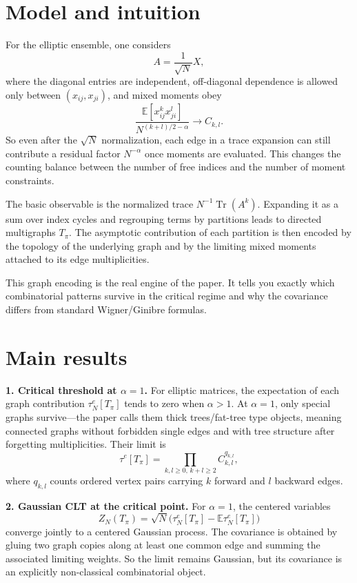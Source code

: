 \documentclass[11pt]{article}
\begin{document}
\section*{Model and intuition}
For the elliptic ensemble, one considers
\[
A=\frac{1}{\sqrt N}X,
\]
where the diagonal entries are independent, off-diagonal dependence is allowed only between $(x_{ij},x_{ji})$, and mixed moments obey
\[
\frac{\mathbb E[x_{ij}^k x_{ji}^l]}{N^{(k+l)/2-\alpha}}\to C_{k,l}.
\]
So even after the $\sqrt N$ normalization, each edge in a trace expansion can still contribute a residual factor $N^{-\alpha}$ once moments are evaluated. This changes the counting balance between the number of free indices and the number of moment constraints.

The basic observable is the normalized trace $N^{-1}\operatorname{Tr}(A^k)$. Expanding it as a sum over index cycles and regrouping terms by partitions leads to directed multigraphs $T_\pi$. The asymptotic contribution of each partition is then encoded by the topology of the underlying graph and by the limiting mixed moments attached to its edge multiplicities.

This graph encoding is the real engine of the paper. It tells you exactly which combinatorial patterns survive in the critical regime and why the covariance differs from standard Wigner/Ginibre formulas.

\section*{Main results}
\textbf{1. Critical threshold at $\alpha=1$.} For elliptic matrices, the expectation of each graph contribution $\tau_N^e[T_\pi]$ tends to zero when $\alpha>1$. At $\alpha=1$, only special graphs survive---the paper calls them thick trees/fat-tree type objects, meaning connected graphs without forbidden single edges and with tree structure after forgetting multiplicities. Their limit is
\[
\tau^e[T_\pi]=\prod_{k,l\ge 0,\,k+l\ge 2} C_{k,l}^{q_{k,l}},
\]
where $q_{k,l}$ counts ordered vertex pairs carrying $k$ forward and $l$ backward edges.

\textbf{2. Gaussian CLT at the critical point.} For $\alpha=1$, the centered variables
\[
Z_N(T_\pi)=\sqrt N\bigl(\tau_N^e[T_\pi]-\mathbb E\tau_N^e[T_\pi]\bigr)
\]
converge jointly to a centered Gaussian process. The covariance is obtained by gluing two graph copies along at least one common edge and summing the associated limiting weights. So the limit remains Gaussian, but its covariance is an explicitly non-classical combinatorial object.
\end{document}

